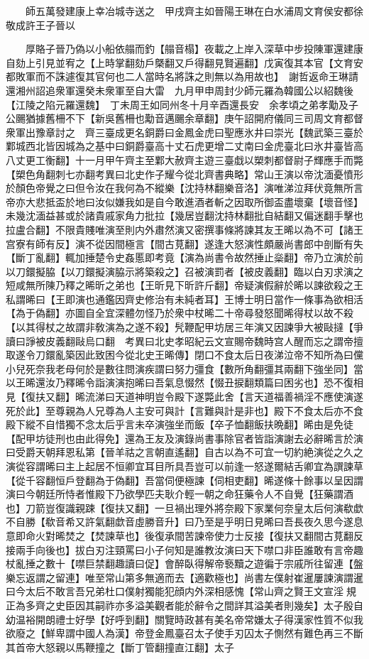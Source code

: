 　　師五萬發建康上幸冶城寺送之　甲戌齊主如晉陽王琳在白水浦周文育侯安都徐敬成許王子晉以

　　厚賂子晉乃偽以小船依䑽而釣【䑽音榻】夜載之上岸入深草中步投陳軍還建康自劾上引見並宥之【上時掌翻劾戶槩翻又戶得翻見賢遍翻】戊寅復其本官【文育安都敗軍而不誅遽復其官何也二人當時名將誅之則無以為用故也】　謝哲返命王琳請還湘州詔追衆軍還癸未衆軍至自大雷　九月甲申周封少師元羅為韓國公以紹魏後【江陵之陷元羅還魏】　丁未周王如同州冬十月辛酉還長安　余孝頃之弟孝勱及子公颺猶據舊柵不下【新吳舊柵也勱音邁颺余章翻】庚午詔開府儀同三司周文育都督衆軍出豫章討之　齊三臺成更名銅爵曰金鳳金虎曰聖應氷井曰崇光【魏武築三臺於鄴城西北皆因城為之基中曰銅爵臺高十丈石虎更增二丈南曰金虎臺北曰氷井臺皆高八丈更工衡翻】十一月甲午齊主至鄴大赦齊主遊三臺戱以槊刺都督尉子輝應手而斃【槊色角翻刺七亦翻考異曰北史作子耀今從北齊書典略】常山王演以帝沈湎憂憤形於顏色帝覺之曰但令汝在我何為不縱樂【沈持林翻樂音洛】演唯涕泣拜伏竟無所言帝亦大悲抵盃於地曰汝似嫌我如是自今敢進酒者斬之因取所御盃盡壞棄【壞音怪】未幾沈湎益甚或於諸貴戚家角力批拉【幾居豈翻沈持林翻批自結翻又偏迷翻手擊也拉盧合翻】不限貴賤唯演至則内外肅然演又密撰事條將諫其友王晞以為不可【諸王宫寮有師有反】演不從因間極言【間古莧翻】遂逢大怒演性頗嚴尚書郎中剖斷有失【斷丁亂翻】輒加捶楚令史姦慝即考竟【演為尚書令故然捶止橤翻】帝乃立演於前以刀鐶擬脇【以刀鐶擬演脇示將築殺之】召被演罰者【被皮義翻】臨以白刃求演之短咸無所陳乃釋之晞昕之弟也【王昕見下昕許斤翻】帝疑演假辭於晞以諫欲殺之王私謂晞曰【王即演也通鑑因齊史修治有未純者耳】王博士明日當作一條事為欲相活【為于偽翻】亦圖自全宜深體勿怪乃於衆中杖晞二十帝尋發怒聞晞得杖以故不殺【以其得杖之故謂非敎演為之遂不殺】髠鞭配甲坊居三年演又因諫爭大被敺撻【爭讀曰諍被皮義翻敺烏口翻　考異曰北史孝昭紀云文宣賜帝魏時宫人醒而忘之謂帝擅取遂令刀鐶亂築因此致困今從北史王晞傳】閉口不食太后日夜涕泣帝不知所為曰儻小兒死奈我老母何於是數往問演疾謂曰努力彊食【數所角翻彊其兩翻下強坐同】當以王晞還汝乃釋晞令詣演演抱晞曰吾氣息惙然【惙丑捩翻類篇曰困劣也】恐不復相見【復扶又翻】晞流涕曰天道神明豈令殿下遂斃此舍【言天道福善禍淫不應使演遂死於此】至尊親為人兄尊為人主安可與計【言難與計是非也】殿下不食太后亦不食殿下縱不自惜獨不念太后乎言未卒演強坐而飯【卒子恤翻飯扶晩翻】晞由是免徒【配甲坊徒刑也由此得免】還為王友及演錄尚書事除官者皆詣演謝去必辭晞言於演曰受爵天朝拜恩私第【晉羊祜之言朝直遙翻】自古以為不可宜一切約絶演從之久之演從容謂晞曰主上起居不恒卿宜耳目所具吾豈可以前逢一怒遂爾結舌卿宜為譔諫草【從千容翻恒戶登翻為于偽翻】吾當伺便極諫【伺相吏翻】晞遂條十餘事以呈因謂演曰今朝廷所恃者惟殿下乃欲學匹夫耿介輕一朝之命狂藥令人不自覺【狂藥謂酒也】刀箭豈復識親踈【復扶又翻】一旦禍出理外將奈殿下家業何奈皇太后何演欷歔不自勝【欷音希又許氣翻歔音虛勝音升】曰乃至是乎明日見晞曰吾長夜久思今遂息意即命火對晞焚之【焚諫草也】後復承間苦諫帝使力士反接【復扶又翻間古莧翻反接兩手向後也】拔白刃注頸罵曰小子何知是誰教汝演曰天下噤口非臣誰敢有言帝趣杖亂捶之數十【噤巨禁翻趣讀曰促】會醉臥得解帝䙝黷之遊徧于宗戚所往留連【盤樂忘返謂之留連】唯至常山第多無適而去【適歡極也】尚書左僕射崔暹屢諫演謂暹曰今太后不敢言吾兄弟杜口僕射獨能犯顔内外深相感愧【常山齊之賢王文宣淫規正為多齊之史臣因其嗣祚亦多溢美觀者能於辭令之間詳其溢美者則幾矣】太子殷自幼温裕開朗禮士好學【好呼到翻】關覽時政甚有美名帝常嫌太子得漢家性質不似我欲廢之【鮮卑謂中國人為漢】帝登金鳳臺召太子使手刃囚太子惻然有難色再三不斷其首帝大怒親以馬鞭撞之【斷丁管翻撞直江翻】太子